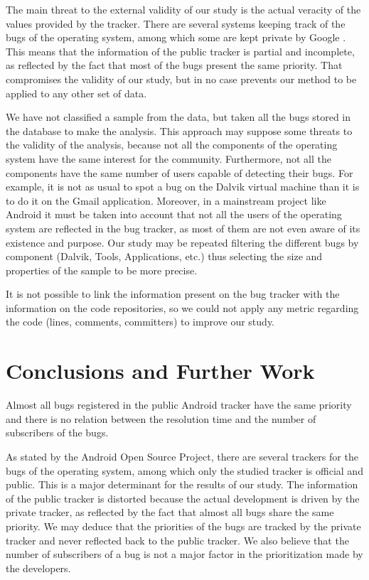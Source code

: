\documentclass[10pt, conference, compsocconf]{IEEEtran}
\begin{document}
The main threat to the external validity of our study is the actual veracity of the values provided by the tracker. There are several systems keeping track of the bugs of the operating system, among which some are kept private by Google \cite{LifeBug}. This means that the information of the public tracker is partial and incomplete, as reflected by the fact that most of the bugs present the same priority. That compromises the validity of our study, but in no case prevents our method to be applied to any other set of data.

We have not classified a sample from the data, but taken all the bugs stored in the database to make the analysis. This approach may suppose some threats to the validity of the analysis, because not all the components of the operating system have the same interest for the community. Furthermore, not all the components have the same number of users capable of detecting their bugs. For example, it is not as usual to spot a bug on the Dalvik virtual machine than it is to do it on the Gmail application. Moreover, in a mainstream project like Android it must be taken into account that not all the users of the operating system are reflected in the bug tracker, as most of them are not even aware of its existence and purpose. Our study may be repeated filtering the different bugs by component (Dalvik, Tools, Applications, etc.) thus selecting the size and properties of the sample to be more precise.

It is not possible to link the information present on the bug tracker with the information on the code repositories, so we could not apply any metric regarding the code (lines, comments, committers) to improve our study.


\section{Conclusions and Further Work}
Almost all bugs registered in the public Android tracker have the same priority and there is no relation between the resolution time and the number of subscribers of the bugs.

As stated by the Android Open Source Project, there are several trackers for the bugs of the operating system, among which only the studied tracker is official and public. This is a major determinant for the results of our study. The information of the public tracker is distorted because the actual development is driven by the private tracker, as reflected by the fact that almost all bugs share the same priority. We may deduce that the priorities of the bugs are tracked by the private tracker and never reflected back to the public tracker. We also believe that the number of subscribers of a bug is not a major factor in the prioritization made by the developers.
\end{document}
